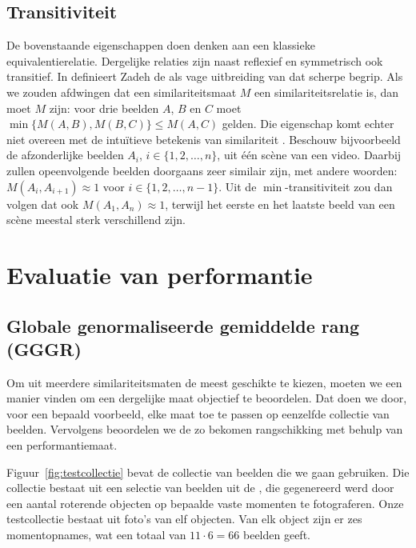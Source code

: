\subsection{Transitiviteit}

De bovenstaande eigenschappen doen denken aan een klassieke equivalentierelatie. Dergelijke
relaties zijn naast reflexief en symmetrisch ook transitief. In 
\cite{zadeh:similarity_relations_and_fuzzy_orderings} definieert Zadeh
de  als vage uitbreiding van dat scherpe begrip. Als we zouden
afdwingen dat een similariteitsmaat $M$ een similariteitsrelatie is, dan moet $M$ 
 zijn: voor drie beelden $A$, $B$ en $C$ moet 
$\min\{M(A,B),M(B,C)\} \le M(A,C)$ gelden. Die
eigenschap komt echter niet overeen met de intu\"itieve betekenis van similariteit
\cite{de_cock:on_unsuitable_relations_for_approx_equal, de_cock:why_fuzzy_relations_do_not_resolve_pointcare_paradox}. 
Beschouw bijvoorbeeld de afzonderlijke beelden $A_i$, $i \in \{1,2,\ldots,n\}$, uit \'e\'en sc\`ene van een video. 
Daarbij zullen opeenvolgende beelden doorgaans zeer similair zijn, met andere woorden: 
$M(A_i,A_{i+1}) \approx 1$ voor $i \in \{1,2,\ldots,n-1\}$. Uit de $\min$-transitiviteit
zou dan volgen dat ook $M(A_1,A_n) \approx 1$, terwijl het eerste en het laatste beeld
van een sc\`ene meestal sterk verschillend zijn.   

\section{Evaluatie van performantie}

\subsection{Globale genormaliseerde gemiddelde rang (GGGR)}

Om uit meerdere similariteitsmaten de meest geschikte te kiezen, 
moeten we een manier vinden om een dergelijke maat objectief te beoordelen. 
Dat doen we door, voor een bepaald voorbeeld, elke maat toe te passen op eenzelfde collectie 
van beelden. Vervolgens beoordelen we de zo bekomen rangschikking met behulp van een performantiemaat.

Figuur~\ref{fig:testcollectie} bevat de collectie van beelden die we gaan 
gebruiken. Die collectie bestaat uit een selectie van beelden uit
de  \cite{coil-100}, die gegenereerd werd 
door een aantal roterende objecten op bepaalde vaste momenten te fotograferen. 
Onze testcollectie bestaat uit foto's van elf objecten. Van elk object zijn
er zes momentopnames, wat een totaal van $11 \cdot 6 = 66$ beelden geeft.

